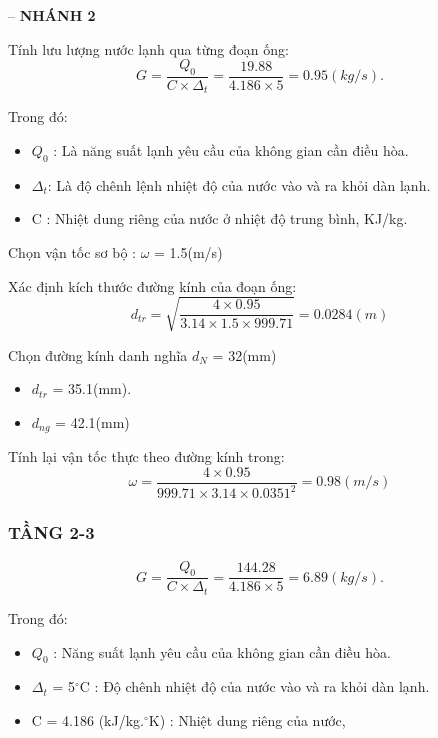-- \textbf{NHÁNH 2}

Tính lưu lượng nước lạnh qua từng đoạn ống:
\begin{equation*}
	G = \dfrac{Q_{0}}{C \times \Delta_{t}} =\dfrac{19.88}{4.186 \times 5} = 0.95(kg/s).
\end{equation*}

Trong đó:
\begin{itemize}
	\item $Q_{0}$ : Là năng suất lạnh yêu cầu của không gian cần điều hòa.
	\item $\Delta_{t}$: Là độ chênh lệnh nhiệt độ của nước vào và ra khỏi dàn lạnh.
	\item C : Nhiệt dung riêng của nước ở nhiệt độ trung bình, KJ/kg.
\end{itemize}

Chọn vận tốc sơ bộ : $\omega$ = 1.5(m/s)

Xác định kích thước đường kính của đoạn ống:
\begin{equation*}
	d_{tr} = \sqrt{\dfrac{4 \times 0.95}{3.14 \times 1.5 \times 999.71}} = 0.0284(m)
\end{equation*}

Chọn đường kính danh nghĩa $d_{N}$ = 32(mm)
\begin{itemize}
	\item $d_{tr}$ = 35.1(mm).
	\item $d_{ng}$ = 42.1(mm)
\end{itemize}

Tính lại vận tốc thực theo đường kính trong:
\begin{equation*}
	\omega = \dfrac{4 \times 0.95 }{999.71 \times 3.14 \times 0.0351^{2}} = 0.98(m/s)
\end{equation*}

\subsubsection{TẦNG 2-3}
\begin{equation*}
	G = \dfrac{Q_{0}}{C \times \Delta_{t}} =\dfrac{144.28}{4.186 \times 5} = 6.89(kg/s).
\end{equation*}

Trong đó:
\begin{itemize}
	\item $Q_{0}$ : Năng suất lạnh yêu cầu của không gian cần điều hòa.
	\item $\Delta_{t}$ = 5$^{\circ}$C : Độ chênh nhiệt độ của nước vào và ra khỏi dàn lạnh.
	\item C = 4.186 (kJ/kg.$^{\circ}$K) : Nhiệt dung riêng của nước,
\end{itemize}

